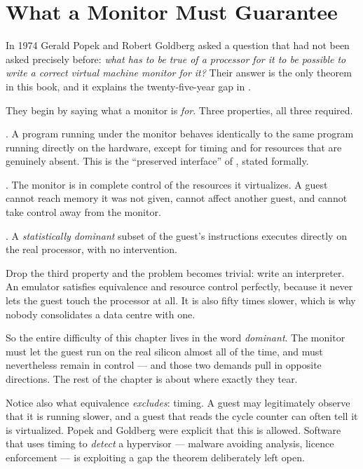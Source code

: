 \section{What a Monitor Must Guarantee}

In 1974 Gerald Popek and Robert Goldberg asked a question that had not been
asked precisely before: \emph{what has to be true of a processor for it to be
possible to write a correct virtual machine monitor for it?} Their answer is
the only theorem in this book, and it explains the twenty-five-year gap in
.

They begin by saying what a monitor is \emph{for}. Three properties, all three
required.

\begin{definitionbox}
\begin{tight}
  \item {}. A program running under the monitor behaves
        identically to the same program running directly on the hardware,
        except for timing and for resources that are genuinely absent. This is
        the ``preserved interface'' of , stated formally.
  \item {}. The monitor is in complete control of the
        resources it virtualizes. A guest cannot reach memory it was not
        given, cannot affect another guest, and cannot take control away from
        the monitor.
  \item {}. A \emph{statistically dominant} subset of the
        guest's instructions executes directly on the real processor, with no
        intervention.
\end{tight}
\end{definitionbox}

\begin{conceptbox}
Drop the third property and the problem becomes trivial: write an interpreter.
An emulator satisfies equivalence and resource control perfectly, because it
never lets the guest touch the processor at all. It is also fifty times slower,
which is why nobody consolidates a data centre with one.

\smallskip
So the entire difficulty of this chapter lives in the word \emph{dominant}. The
monitor must let the guest run on the real silicon almost all of the time, and
must nevertheless remain in control --- and those two demands pull in opposite
directions. The rest of the chapter is about where exactly they tear.

\smallskip
Notice also what equivalence \emph{excludes}: timing. A guest may legitimately
observe that it is running slower, and a guest that reads the cycle counter can
often tell it is virtualized. Popek and Goldberg were explicit that this is
allowed. Software that uses timing to \emph{detect} a hypervisor --- malware
avoiding analysis, licence enforcement --- is exploiting a gap the theorem
deliberately left open.
\end{conceptbox}

